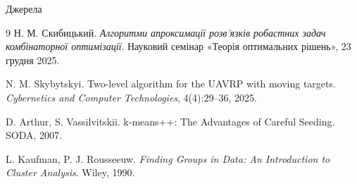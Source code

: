 \documentclass[aspectratio=169,11pt]{beamer}
\begin{document}
\begin{frame}{Джерела}
    \footnotesize
    \begin{thebibliography}{9}
        Н. М. Скибицький.
        \newblock \emph{Алгоритми апроксимації розв'язків робастних задач комбінаторної оптимізації}.
        \newblock Науковий семінар «Теорія оптимальних рішень», 23 грудня 2025.

        N. M. Skybytskyi.
        \newblock Two-level algorithm for the UAVRP with moving targets.
        \newblock \emph{Cybernetics and Computer Technologies}, 4(4):29--36, 2025.

        D. Arthur, S. Vassilvitskii.
        \newblock k-means++: The Advantages of Careful Seeding.
        \newblock SODA, 2007.

        L. Kaufman, P. J. Rousseeuw.
        \newblock \emph{Finding Groups in Data: An Introduction to Cluster Analysis}.
        \newblock Wiley, 1990.
    \end{thebibliography}
\end{frame}
\end{document}
